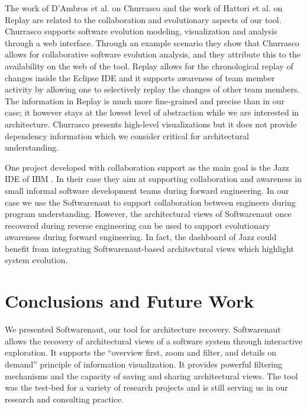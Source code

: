 \documentclass[preprint,12pt]{elsarticle}
\begin{document}
The work of D'Ambros et al. on Churrasco \cite{dambros-churrasco} and the work of Hattori et al.  on Replay \cite{hattori-replay} are related to the collaboration and evolutionary aspects of our tool. Churrasco supports software evolution modeling, visualization and analysis through a web interface. Through an example scenario they show that Churrasco allows for collaborative software evolution analysis, and they attribute this to the availability on the web of the tool. Replay allows for the chronological replay of changes inside the Eclipse IDE and it supports awareness of team member activity by allowing one to selectively replay the changes of other team members. The information in Replay is much more fine-grained and precise than in our case; it however stays at the lowest level of abstraction while we are interested in architecture. Churrasco presents high-level visualizations but it does not provide dependency information which we consider critical for architectural understanding. 

One project developed with collaboration support as the main goal is the Jazz IDE of IBM \cite{hupfer-jazz}. 
In their case they aim at supporting collaboration and awareness in small informal software development teams during forward engineering. In our case we use the Softwarenaut to support collaboration between engineers during program understanding. However, the architectural views of Softwarenaut once recovered during reverse engineering can be used to support evolutionary awareness during forward engineering. In fact, the dashboard of Jazz could benefit from integrating Softwarenaut-based architectural views which highlight system evolution.

\section {Conclusions and Future Work} \label {sec:conc}

We presented Softwarenaut, our tool for architecture recovery. Softwarenaut allows the recovery of architectural views of a software system through interactive exploration. It supports the ``overview first, zoom and filter, and details on demand'' principle of information visualization. It provides powerful filtering mechanisms and the capacity of saving and sharing architectural views. The tool was the test-bed for a variety of research projects and is still serving us in our research and consulting practice. 
\end{document}
